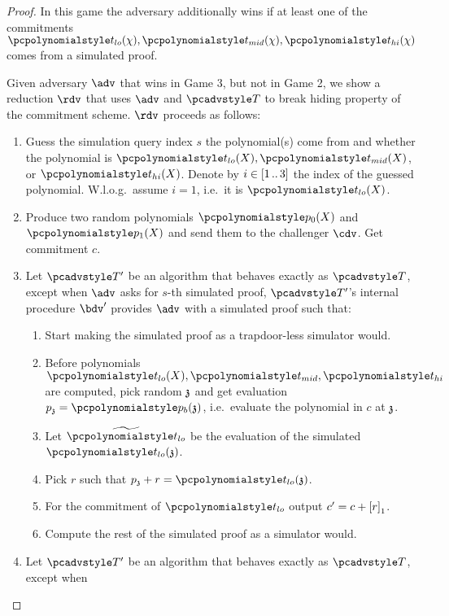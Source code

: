 \documentclass[runningheads,11pt]{llncs}
\begin{document}
\begin{proof}
   In this game the adversary additionally wins if at least one of
  the commitments $\p{t_{lo}} (\chi), \p{t_{mid}} (\chi), \p{t_{hi}} (\chi)$
  comes from a simulated proof.

   Given adversary $\adv$ that wins in Game
  3, but not in Game 2, we show a reduction $\rdv$ that uses $\adv$ and $\tdv$
  to break hiding property
  of the commitment scheme. $\rdv$ proceeds as follows:
  \begin{enumerate}
  \item Guess the simulation query index $s$ the polynomial(s) come from and
    whether the polynomial is $\p{t_{lo}} (X), \p{t_{mid}} (X)$, or
    $\p{t_{hi}} (X)$. Denote by $i \in [1 \, .. \, 3]$ the index of the guessed
    polynomial. W.l.o.g.~assume $i = 1$, i.e.~it is $\p{t_{lo}} (X)$.
  \item Produce two random polynomials $\p{p_0} (X)$ and $\p{p_1} (X)$ and
    send them to the challenger $\cdv$. Get commitment $c$.
  \item Let $\tdv'$ be an algorithm that behaves exactly as $\tdv$, except when
    $\adv$ asks for $s$-th simulated proof, $\tdv'$'s internal procedure $\bdv'$
    provides $\adv$ with a simulated proof such that:
    \begin{enumerate}
    \item Start making the simulated proof as a trapdoor-less simulator would.
    \item Before polynomials $\p{t_{lo}} (X), \p{t_{mid}}, \p{t_{hi}}$ are
      computed, pick random $\mathfrak{z}$ and get evaluation $p_\chz = \p{p_b} (\chz)$,
      i.e.~evaluate the polynomial in $c$ at $\mathfrak{z}$.
    \item Let $\ev{t_{lo}}$ be the evaluation of the simulated $\p{t_{lo}} (\chz)$.
    \item Pick $r$ such that $p_\chz + r = \p{t_{lo}} (\chz)$.
    \item For the commitment of $\p{t_{lo}}$ output $c' = c + \left[r\right]_{1}$.
    \item Compute the rest of the simulated proof as a simulator would.
    \end{enumerate}
  \item Let $\tdv'$ be an algorithm that behaves exactly as $\tdv$, except when

\end{enumerate}
\end{proof}
\end{document}
